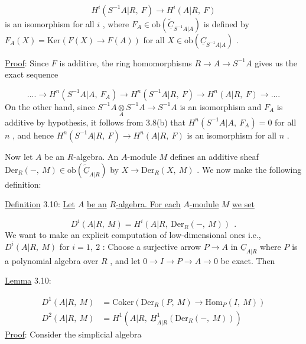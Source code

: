 \begin{equation*}
H^{i}(S^{-1}A|R,\ F) \rightarrow H^{i}(A|R,\ F)
\end{equation*}
is an isomorphism for all  $i$  , where  $F_{A} \in \mathrm{ob}\!\left(\widetilde{\underline{C}}_{S^{-1}A|A}\right)$  is defined by $F_{A}(X) = \mathrm{Ker}(F(X) \rightarrow F(A))$  for all  $X \in \mathrm{ob}\!\left(\underline{C}_{S^{-1}A|A}\right)$  .

\underline{Proof}:  Since  $F$  is additive, the ring homomorphisms  $R \rightarrow A \rightarrow S^{-1}A$  gives us the exact sequence

\begin{equation*}
.... \rightarrow H^{n}(S^{-1}A|A,\ F_{A}) \rightarrow H^{n}(S^{-1}A|R,\ F) \rightarrow H^{n}(A|R,\ F) \rightarrow ....
\end{equation*}
On the other hand, since  $S^{-1}A\underset{A}{\otimes}S^{-1}A \rightarrow S^{-1}A$  is an isomorphism and  $F_{A}$  is additive by hypothesis, it follows from 3.8(b) that  $H^{n}(S^{-1}A|A,\ F_{A}) = 0$  for all  $n$  , and hence  $H^{n}(S^{-1}A|R,\ F) \rightarrow H^{n}(A|R,\ F)$  is an isomorphism for all  $n$  .



Now let  $A$  be an $R$-algebra. An $A$-module  $M$  defines an additive sheaf $\mathrm{Der}_R(-,\ M) \in \mathrm{ob}(\widetilde{\underline{C}}_{A|R})$  by  $X \to \mathrm{Der}_R(X,\ M)$  . We now make the following definition:


\underline{Definition} 3.10:  \underline{Let}  $A$  \underline{be an} $R$\underline{-algebra. For each} $A$\underline{-module}  $M$  \underline{we set}

\begin{equation*}
D^i(A|R,\ M) = H^i(A|R,\ \mathrm{Der}_R(-,\ M)) \ \ .
\end{equation*}
We want to make an explicit computation of low-dimensional ones i.e., $D^i(A|R,\ M)$  for  $i = 1,\ 2$  : Choose a surjective arrow  $P \to A$  in  $\underline{C}_{A|R}$  where  $P$  is a polynomial algebra over  $R$  , and let  $0 \to I \to P \to A \to 0$  be exact. Then


\underline{Lemma} 3.10:

\begin{equation*}
\begin{aligned}
D^1(A|R,\ M) &= \mathrm{Coker}(\mathrm{Der}_R(P,\ M) \to \mathrm{Hom}_P(I,\ M)) \\
D^2(A|R,\ M) &= H^1(A|R,\ \underline{H}^1_{A|R}(\mathrm{Der}_R(-,\ M)))
\end{aligned}
\end{equation*}
\underline{Proof}:  Consider the simplicial algebra

